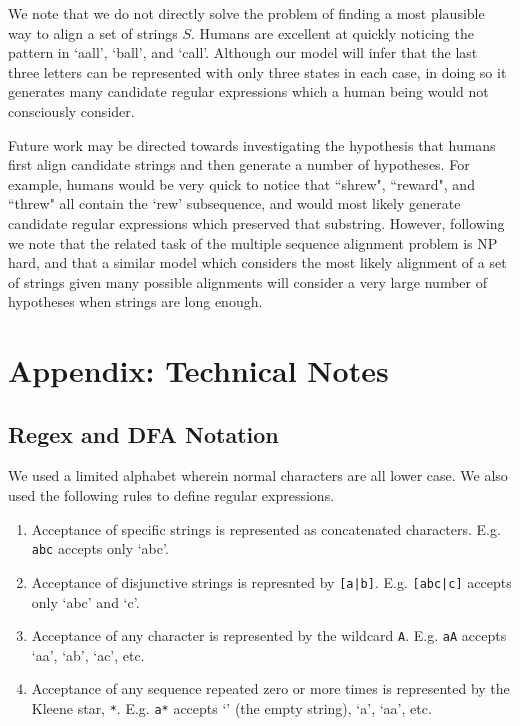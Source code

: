 \documentclass[10pt,letterpaper]{article}
\begin{document}
We note that we do not directly solve the problem of finding a most plausible way to align a set of strings $S$. Humans are excellent at quickly noticing the pattern in `aall', `ball', and `call'. Although our model will infer that the last three letters can be represented with only three states in each case, in doing so it generates many candidate regular expressions which a human being would not consciously consider.  

Future work may be directed towards investigating the hypothesis that humans first align candidate strings and then generate a number of hypotheses. For example, humans would be very quick to notice that ``shrew", ``reward", and ``threw" all contain the `rew' subsequence, and would most likely generate candidate regular expressions which preserved that substring. However, following  we note that the related task of the multiple sequence alignment problem is NP hard, and that a similar model which considers the most likely alignment of a set of strings given many possible alignments will consider a very large number of hypotheses when strings are long enough.  

\setlength{\bibleftmargin}{.125in}
\setlength{\bibindent}{-\bibleftmargin}
 

\section{Appendix: Technical Notes}
\subsection{Regex and DFA Notation}
We used a limited alphabet wherein normal characters are all lower case. We also used the following rules to define regular expressions.
\begin{enumerate}
	\item Acceptance of specific strings is represented as concatenated characters. E.g. \verb!abc! accepts only `abc'.
	\item Acceptance of disjunctive strings is represnted by \verb![a|b]!. E.g. \verb![abc|c]! accepts only `abc' and `c'.
	\item Acceptance of any character is represented by the wildcard \verb!A!. E.g. \verb!aA! accepts `aa', `ab', `ac', etc.
	\item Acceptance of any sequence repeated zero or more times is represented by the Kleene star, \verb!*!. E.g. \verb!a*! accepts `' (the empty string), `a', `aa', etc. 
\end{enumerate}
\end{document}
